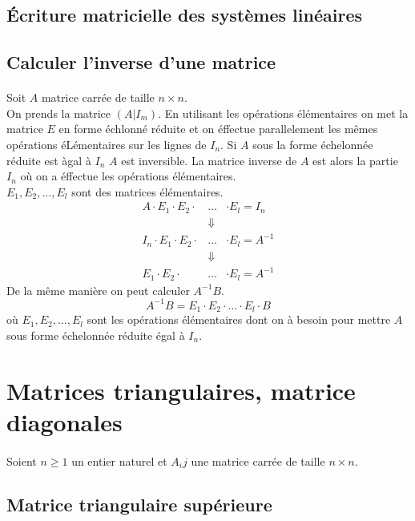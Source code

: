 \subsection{Écriture matricielle des systèmes linéaires}

%
\subsection{Calculer l'inverse d'une matrice}
%
\paragraph{} Soit $A$ matrice carrée de taille $n\times n$. \\
On prends la matrice $(A \vert I_m)$. En utilisant les opérations élémentaires on met la matrice $E$ en forme échlonné réduite et on éffectue parallelement les mêmes opérations éLémentaires sur les lignes de $I_n$. Si $A$ sous la forme échelonnée réduite est àgal à $I_n$ $A$ est inversible. La matrice inverse de $A$ est alors la partie $I_n$ où on a éffectue les opérations élémentaires. \\
$E_1, E_2, \ldots, E_l$ sont des matrices élémentaires.
\begin{eqnarray*}
  A \cdot E_1 \cdot E_2 \cdot &\ldots& \cdot E_l = I_n \\
  &\Downarrow& \\
  I_n \cdot E_1 \cdot E_2 \cdot &\ldots& \cdot E_l = A^{-1} \\
  &\Downarrow& \\
  E_1 \cdot E_2 \cdot &\ldots& \cdot E_l = A^{-1}
\end{eqnarray*}
De la même manière on peut calculer $A^{-1} B$.
$$A^{-1} B = E_1 \cdot E_2 \cdot \ldots \cdot E_l \cdot B$$
où $E_1, E_2, \ldots, E_l$ sont les opérations élémentaires dont on à besoin pour mettre $A$ sous forme échelonnée réduite égal à $I_n$.

%
%
\section{Matrices triangulaires, matrice diagonales}
%
%
\paragraph{} Soient $n \geq 1$ un entier naturel et $A_ij$ une matrice carrée de taille $n\times n$.

%
\subsection{Matrice triangulaire supérieure}
%
